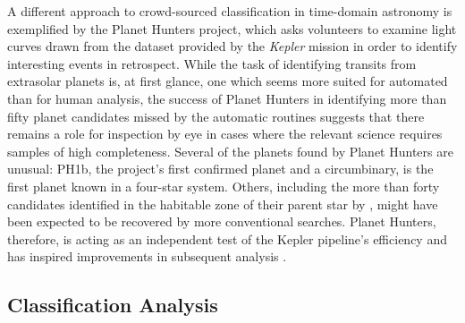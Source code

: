 \documentclass{ar2e}
\begin{document}
A different approach to crowd-sourced classification in time-domain astronomy is
exemplified by the Planet Hunters project, which asks volunteers to examine
light curves drawn from the dataset provided by the \textit{Kepler} mission in
order to identify interesting events in retrospect. While the task of
identifying transits from extrasolar planets is, at first glance, one which
seems more suited for automated than for human analysis, the success of Planet
Hunters in identifying more than fifty planet candidates missed by the automatic
routines suggests that there remains a role for inspection by eye in cases where
the relevant science requires samples of high completeness. Several of the
planets found by Planet Hunters are unusual: PH1b, the project's first confirmed
planet \citep{Schwamb++2013} and a circumbinary, is the first planet known in a
four-star system. Others, including the more than forty candidates identified in
the habitable zone of their parent star by \citep{Wang++2013}, might have been
expected to be recovered by more conventional searches. Planet Hunters,
therefore, is acting as an independent test of the Kepler pipeline's efficiency
\citep{Schwamb++2012} and has inspired improvements in subsequent analysis
\citep{Batalha++2013}. 



\subsection{Classification Analysis}
\label{sec:class:analysis}
\end{document}
